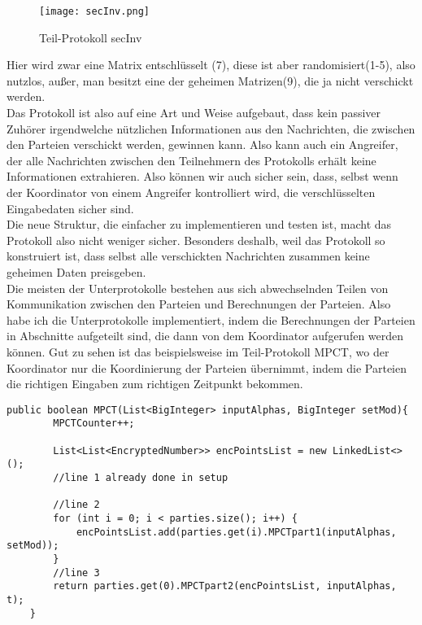 \begin{figure}[h]
\begin{center}
\texttt{[image: secInv.png]}
\caption{Teil-Protokoll secInv}
\cite{Doettling2021}
\label{oInv}
\end{center}

\end{figure}

Hier wird zwar eine Matrix entschlüsselt (7), diese ist aber randomisiert(1-5), also nutzlos, außer, man besitzt eine der geheimen Matrizen(9), die ja nicht verschickt werden.\\
Das Protokoll ist also auf eine Art und Weise aufgebaut, dass kein passiver Zuhörer irgendwelche nützlichen Informationen aus den Nachrichten, die zwischen den Parteien verschickt werden, gewinnen kann. Also kann auch ein Angreifer, der alle Nachrichten zwischen den Teilnehmern des Protokolls erhält keine Informationen extrahieren. Also können wir auch sicher sein, dass, selbst wenn der Koordinator von einem Angreifer kontrolliert wird, die verschlüsselten Eingabedaten sicher sind.\\
Die neue Struktur, die einfacher zu implementieren und testen ist, macht das Protokoll also nicht weniger sicher. Besonders deshalb, weil das Protokoll so konstruiert ist, dass selbst alle verschickten Nachrichten zusammen keine geheimen Daten preisgeben.\\

Die meisten der Unterprotokolle bestehen aus sich abwechselnden Teilen von Kommunikation zwischen den Parteien und Berechnungen der Parteien. Also habe ich die Unterprotokolle implementiert, indem die Berechnungen der Parteien in Abschnitte aufgeteilt sind, die dann von dem Koordinator aufgerufen werden können. Gut zu sehen ist das beispielsweise im Teil-Protokoll MPCT, wo der Koordinator nur die Koordinierung der Parteien übernimmt, indem die Parteien die richtigen Eingaben zum richtigen Zeitpunkt bekommen.\\

\begin{lstlisting}
public boolean MPCT(List<BigInteger> inputAlphas, BigInteger setMod){
        MPCTCounter++;

        List<List<EncryptedNumber>> encPointsList = new LinkedList<>();
        //line 1 already done in setup

        //line 2
        for (int i = 0; i < parties.size(); i++) {
            encPointsList.add(parties.get(i).MPCTpart1(inputAlphas, setMod));
        }
        //line 3
        return parties.get(0).MPCTpart2(encPointsList, inputAlphas, t);
    }


\end{lstlisting}

